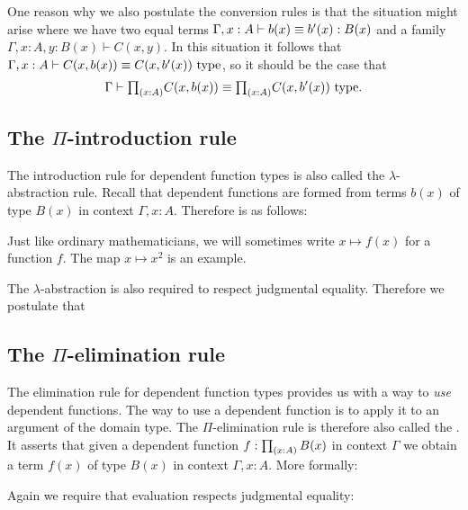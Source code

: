 \begin{rmk}
  One reason why we also postulate the conversion rules is that the situation might arise where we have two equal terms $\Gamma,x:A\vdash b(x)\jdeq b'(x):B(x)$ and a family $\Gamma,x:A,y:B(x)\vdash C(x,y)$. In this situation it follows that $\Gamma,x:A\vdash C(x,b(x))\jdeq C(x,b'(x))~\mathrm{type}$, so it should be the case that
  \begin{equation*}
    \Gamma\vdash \prd{x:A}C(x,b(x))\jdeq\prd{x:A}C(x,b'(x))~\mathrm{type}.
  \end{equation*}
\end{rmk}

\subsection{The $\Pi$-introduction rule}
The introduction rule for dependent function types is also called the $\lambda$-abstraction rule. Recall that dependent functions are formed from terms $b(x)$ of type $B(x)$ in context $\Gamma,x:A$. Therefore  is as follows:
\begin{prooftree}
\end{prooftree}
\begin{rmk}
  Just like ordinary mathematicians, we will sometimes write $x\mapsto f(x)$ for a function $f$. The map $x\mapsto x^2$ is an example.
\end{rmk}
The $\lambda$-abstraction is also required to respect judgmental equality. Therefore we postulate that
\begin{prooftree}
\end{prooftree}

\subsection{The $\Pi$-elimination rule}

The elimination rule for dependent function types provides us with a way to \emph{use} dependent functions. The way to use a dependent function is to apply it to an argument of the domain type. The $\Pi$-elimination rule is therefore also called the . It asserts that given a dependent function $f:\prd{x:A}B(x)$ in context $\Gamma$ we obtain a term $f(x)$ of type $B(x)$ in context $\Gamma,x:A$. More formally:
\begin{prooftree}
\end{prooftree}
Again we require that evaluation respects judgmental equality:
\begin{prooftree}
\end{prooftree}

